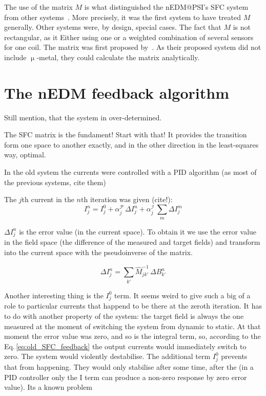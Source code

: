 The use of the matrix $M$ is what distinguished the nEDM@PSI's SFC system from other systems~\cite{Kelha1982,Brake1991,Spemann2003,Brys2005,Kobayashi2012,Voigt2013}. More precisely, it was the first system to have treated $M$ generally. Other systems were, by design, special cases.  The fact that $M$ is not rectangular, as it Either using one or a weighted combination of several sensors for one coil.
The matrix was first proposed by~\cite{RetaHernandez1998}. As their proposed system did not include $\upmu$-metal, they could calculate the matrix analytically.


\section{The nEDM feedback algorithm}

Still mention, that the system in over-determined.

The SFC matrix is the fundament! Start with that! It provides the transition form one space to another exactly, and in the other direction in the least-squares way, optimal.


In the old system the currents were controlled with a PID algorithm (as most of the previous systems, cite them)

The $j$th current in the $n$th iteration was given (cite!):
\begin{equation}
  \label{eq:old_SFC_feedback}
  I^n_j = I^0_j + \alpha^\mathcal{P}_j \, \Delta I^n_j + \alpha^\mathcal{I}_j \, \sum_m \Delta I^m_j
\end{equation}

$\Delta I^n_j$ is the error value (in the current space). To obtain it we use the error value in the field space (the difference of the measured and target fields) and transform into the current space with the pseudoinverse of the matrix.

\begin{equation}
  \Delta I^n_j = \sum_{k'} \hat{M}^{-1}_{jk'} \, \Delta B^n_{k'}
\end{equation}

Another interesting thing is the $I^0_j$ term. It seems weird to give such a big of a role to particular currents that happend to be there at the zeroth iteration. It has to do with another property of the system: the target field is always the one measured at the moment of switching the system from dynamic to static.
At that moment the error value was zero, and so is the integral term, so, according to the Eq.\,\ref{eq:old_SFC_feedback} the output currents would immediately switch to zero. The system would violently destabilise. The additional term $I^0_j$ prevents that from happening. They would only stabilise after some time, after the (in a PID controller only the I term can produce a non-zero response by zero error value). Its a known problem 





